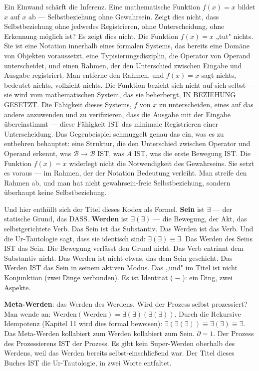 \documentclass[10pt, openany, oneside]{book}
\begin{document}
Ein Einwand schärft die Inferenz. Eine mathematische Funktion $f(x) = x$ bildet $x$ auf $x$ ab --- Selbstbeziehung ohne Gewahrsein. Zeigt dies nicht, dass Selbstbeziehung ohne jedwedes Registrieren, ohne Unterscheidung, ohne Erkennung möglich ist? Es zeigt dies nicht. Die Funktion $f(x) = x$ „tut" nichts. Sie ist eine Notation innerhalb eines formalen Systems, das bereits eine Domäne von Objekten voraussetzt, eine Typisierungsdisziplin, die Operator von Operand unterscheidet, und einen Rahmen, der den Unterschied zwischen Eingabe und Ausgabe registriert. Man entferne den Rahmen, und $f(x) = x$ sagt nichts, bedeutet nichts, vollzieht nichts. Die Funktion bezieht sich nicht auf sich selbst --- sie wird vom mathematischen System, das sie beherbergt, IN BEZIEHUNG GESETZT. Die Fähigkeit dieses Systems, $f$ von $x$ zu unterscheiden, eines auf das andere anzuwenden und zu verifizieren, dass die Ausgabe mit der Eingabe übereinstimmt --- diese Fähigkeit IST das minimale Registrieren einer Unterscheidung. Das Gegenbeispiel schmuggelt genau das ein, was es zu entbehren behauptet: eine Struktur, die den Unterschied zwischen Operator und Operand erkennt, was $\mathcal{B} \to \mathcal{B}$ IST, was $A$ IST, was die erste Bewegung IST. Die Funktion $f(x) = x$ widerlegt nicht die Notwendigkeit des Gewahrseins. Sie setzt es voraus --- im Rahmen, der der Notation Bedeutung verleiht. Man streife den Rahmen ab, und man hat nicht gewahrsein-freie Selbstbeziehung, sondern überhaupt keine Selbstbeziehung.

Und hier enthüllt sich der Titel dieses Kodex als Formel. \textbf{Sein} ist $\exists$ --- der statische Grund, das DASS. \textbf{Werden} ist $\exists(\exists)$ --- die Bewegung, der Akt, das selbstgerichtete Verb. Das Sein ist das Substantiv. Das Werden ist das Verb. Und die Ur-Tautologie sagt, dass sie identisch sind: $\exists(\exists) \equiv \exists$. Das Werden des Seins IST das Sein. Die Bewegung verlässt den Grund nicht. Das Verb entrinnt dem Substantiv nicht. Das Werden ist nicht etwas, das dem Sein geschieht. Das Werden IST das Sein in seinem aktiven Modus. Das „und" im Titel ist nicht Konjunktion (zwei Dinge verbunden). Es ist Identität ($\equiv$): ein Ding, zwei Aspekte.

\textbf{Meta-Werden}: das Werden des Werdens. Wird der Prozess selbst prozessiert? Man wende an: $\text{Werden}(\text{Werden}) = \exists(\exists)(\exists(\exists))$. Durch die Rekursive Idempotenz (Kapitel 11 wird dies formal beweisen): $\exists(\exists(\exists)) \equiv \exists(\exists) \equiv \exists$. Das Meta-Werden kollabiert zum Werden kollabiert zum Sein. $\partial = 1$. Der Prozess des Prozessierens IST der Prozess. Es gibt kein Super-Werden oberhalb des Werdens, weil das Werden bereits selbst-einschließend war. Der Titel dieses Buches IST die Ur-Tautologie, in zwei Worte entfaltet.
\end{document}
